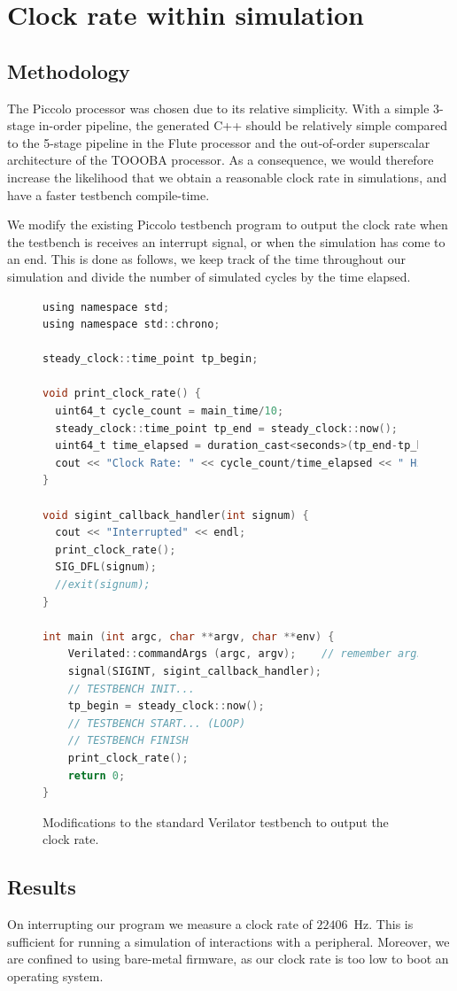 \documentclass[a4paper,8pt]{report}
\begin{document}
\section{Clock rate within simulation}
\subsection{Methodology}
The Piccolo processor was chosen due to its relative simplicity. With a simple
3-stage in-order pipeline, the generated C++ should be relatively simple
compared to the 5-stage pipeline in the Flute processor and the out-of-order
superscalar architecture of the TOOOBA processor. As a consequence, we would
therefore increase the likelihood that we obtain a reasonable clock rate in
simulations, and have a faster testbench compile-time.

We modify the existing Piccolo testbench program to output the clock rate when
the testbench is receives an interrupt signal, or when the simulation has come
to an end. This is done as follows, we keep track of the time throughout our
simulation and divide the number of simulated cycles by the time elapsed.
\begin{figure}[h]
\begin{lstlisting}[language=C,style=customc]
using namespace std;
using namespace std::chrono;

steady_clock::time_point tp_begin;

void print_clock_rate() {
  uint64_t cycle_count = main_time/10;
  steady_clock::time_point tp_end = steady_clock::now();
  uint64_t time_elapsed = duration_cast<seconds>(tp_end-tp_begin).count();
  cout << "Clock Rate: " << cycle_count/time_elapsed << " Hz" << endl;
}

void sigint_callback_handler(int signum) {
  cout << "Interrupted" << endl;
  print_clock_rate();
  SIG_DFL(signum);
  //exit(signum);
}

int main (int argc, char **argv, char **env) {
    Verilated::commandArgs (argc, argv);    // remember args
    signal(SIGINT, sigint_callback_handler);
    // TESTBENCH INIT...
    tp_begin = steady_clock::now();
    // TESTBENCH START... (LOOP)
    // TESTBENCH FINISH
    print_clock_rate();
    return 0;
}
\end{lstlisting}
\caption{Modifications to the standard Verilator testbench to output the clock rate.}
\end{figure}


\subsection{Results}
On interrupting our program we measure a clock rate of $22406$~Hz. This is
sufficient for running a simulation of interactions with a peripheral. Moreover,
we are confined to using bare-metal firmware, as our clock rate is too low to
boot an operating system.
\end{document}
